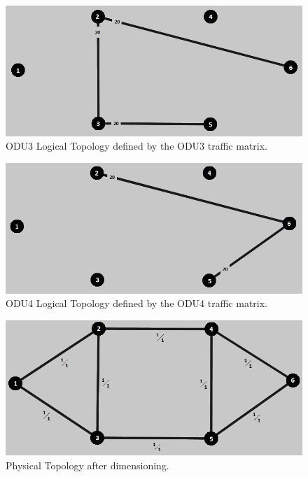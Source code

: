 \begin{figure}[H]
\centering
\includegraphics[width=13cm]{sdf/heuristic/transparent_protection/high/logical_topology_odu3_high}
\caption{ODU3 Logical Topology defined by the ODU3 traffic matrix.}
\label{logical_ODU3_protection_ref_high_heuristic_transparent}
\end{figure}

\begin{figure}[H]
\centering
\includegraphics[width=13cm]{sdf/heuristic/transparent_protection/high/logical_topology_odu4_high}
\caption{ODU4 Logical Topology defined by the ODU4 traffic matrix.}
\label{logical_ODU4_protection_ref_high_heuristic_transparent}
\end{figure}

\begin{figure}[H]
\centering
\includegraphics[width=13cm]{sdf/heuristic/transparent_protection/high/physical_topology_high}
\caption{Physical Topology after dimensioning.}
\label{physical_topology_protection_ref_high_heuristic_transparent}
\end{figure}

